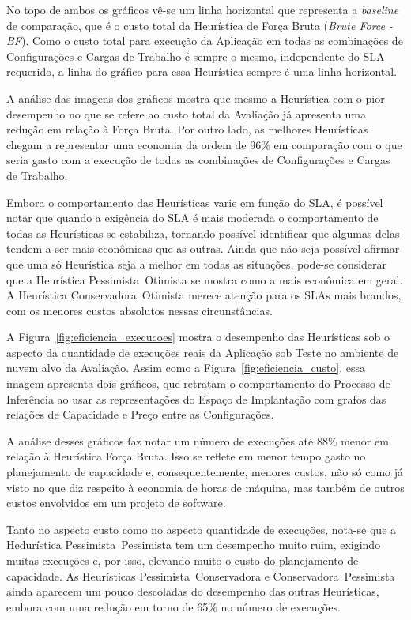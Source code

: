 No topo de ambos os gráficos vê-se um linha horizontal que representa a 
\emph{baseline} de comparação, que é o custo total da Heurística de Força Bruta 
(\emph{Brute Force - BF}). Como o custo total para execução da Aplicação em todas
as combinações de Configurações e Cargas de Trabalho é sempre o mesmo, independente
do SLA requerido, a linha do gráfico para essa Heurística sempre é uma linha
horizontal.

A análise das imagens dos gráficos mostra que mesmo a Heurística com o pior 
desempenho no que se refere ao custo total da Avaliação já apresenta uma redução 
em relação à Força Bruta. Por outro lado, as melhores Heurísticas chegam a 
representar uma economia da ordem de 96\% em comparação com o que seria gasto
com a execução de todas as combinações de Configurações e Cargas de Trabalho.

Embora o comportamento das Heurísticas varie em função do SLA, é possível notar
que quando a exigência do SLA é mais moderada o comportamento de todas as Heurísticas
se estabiliza, tornando possível identificar que algumas delas tendem a
ser mais econômicas que as outras. Ainda que não seja possível afirmar que uma só 
Heurística seja a melhor em todas as situações, pode-se considerar que a Heurística
Pessimista~Otimista se mostra como a mais econômica em geral. A Heurística
Conservadora~Otimista merece atenção para os SLAs mais brandos, com os menores
custos absolutos nessas circunstâncias. 
 
A Figura~\ref{fig:eficiencia_execucoes} mostra o desempenho das Heurísticas sob 
o aspecto da quantidade de execuções reais da Aplicação sob Teste no ambiente de
nuvem alvo da Avaliação. Assim como a Figura~\ref{fig:eficiencia_custo}, essa 
imagem apresenta dois gráficos, que retratam o comportamento do Processo de 
Inferência ao usar as representações do Espaço de Implantação com grafos das 
relações de Capacidade e Preço entre as Configurações.

A análise desses gráficos faz notar um número de execuções até 88\% menor em 
relação à Heurística Força Bruta. Isso se reflete em menor tempo gasto no 
planejamento de capacidade e, consequentemente, menores custos, não só como já 
visto no que diz respeito à economia de horas de máquina, mas também de outros 
custos envolvidos em um projeto de software.

Tanto no aspecto custo como no aspecto quantidade de execuções, nota-se que a
Hedurística Pessimista~Pessimista tem um desempenho muito ruim, exigindo muitas
execuções e, por isso, elevando muito o custo do planejamento de capacidade. As
Heurísticas Pessimista~Conservadora e Conservadora~Pessimista ainda aparecem
um pouco descoladas do desempenho das outras Heurísticas, embora com uma redução
em torno de 65\% no número de execuções.

